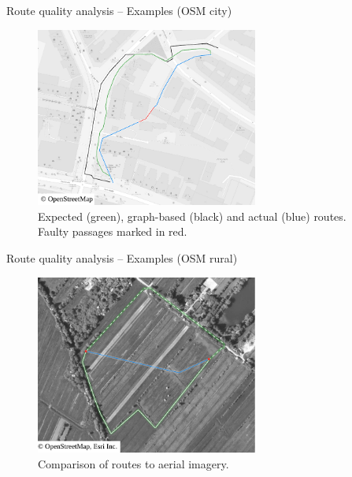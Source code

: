 \documentclass[xcolor={x11names}]{beamer}
\newenvironment{figcenter}
{%
	\parskip=0pt%
	\par%
	\nopagebreak%
	\centering%
}%
{%
	\par%
	\noindent%
	\ignorespacesafterend%
}
\begin{document}
	\begin{frame}{Route quality analysis -- Examples (OSM city)}
		\begin{figure}
			\begin{figcenter}
				\includegraphics[width=0.65\textwidth]{../thesis/images/qgis-routing-city-routing-3.pdf}
			\end{figcenter}
			\caption{Expected (green), graph-based (black) and actual (blue) routes. Faulty passages marked in red.}
		\end{figure}
	\end{frame}
	
	\begin{frame}{Route quality analysis -- Examples (OSM rural)}
		\begin{figure}
			\begin{figcenter}
				\includegraphics[width=0.65\textwidth]{../thesis/images/qgis-routing-rural-routing-6-aerial.pdf}
			\end{figcenter}
			\caption{Comparison of routes to aerial imagery.}
		\end{figure}
	\end{frame}
	
\end{document}
